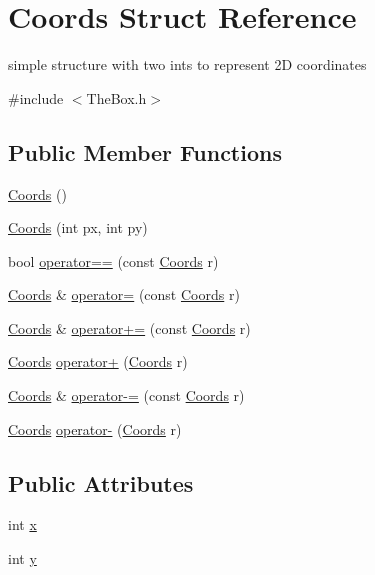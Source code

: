 \hypertarget{struct_coords}{\section{\-Coords \-Struct \-Reference}
\label{struct_coords}
}


simple structure with two ints to represent 2\-D coordinates  




{\ttfamily \#include $<$\-The\-Box.\-h$>$}

\subsection*{\-Public \-Member \-Functions}
\begin{DoxyCompactItemize}
\item 
\hyperlink{struct_coords_a5922d1783cefa759950faa50ac347191}{\-Coords} ()
\item 
\hyperlink{struct_coords_aa268e580151ea70eec212852dd4c5f94}{\-Coords} (int px, int py)
\item 
bool \hyperlink{struct_coords_a7507f92d1feefa3355ae8e9edae34e54}{operator==} (const \hyperlink{struct_coords}{\-Coords} r)
\item 
\hyperlink{struct_coords}{\-Coords} \& \hyperlink{struct_coords_a25bcb0e2d2f5677a10b7652e90a6f97b}{operator=} (const \hyperlink{struct_coords}{\-Coords} r)
\item 
\hyperlink{struct_coords}{\-Coords} \& \hyperlink{struct_coords_a2549173108b2479b62fd79b82ec54e01}{operator+=} (const \hyperlink{struct_coords}{\-Coords} r)
\item 
\hyperlink{struct_coords}{\-Coords} \hyperlink{struct_coords_a168a9ed9edbffaf04e67c5b39306ca99}{operator+} (\hyperlink{struct_coords}{\-Coords} r)
\item 
\hyperlink{struct_coords}{\-Coords} \& \hyperlink{struct_coords_a9f61875c64b3726afd0bb0d465889bad}{operator-\/=} (const \hyperlink{struct_coords}{\-Coords} r)
\item 
\hyperlink{struct_coords}{\-Coords} \hyperlink{struct_coords_a7cc7a225781b6bbad3e00a5e9572fee1}{operator-\/} (\hyperlink{struct_coords}{\-Coords} r)
\end{DoxyCompactItemize}
\subsection*{\-Public \-Attributes}
\begin{DoxyCompactItemize}
\item 
int \hyperlink{struct_coords_a59992d986e76375f31828d32c05cd15d}{x}
\item 
int \hyperlink{struct_coords_a7ed64d02fb7550f1506a93fcfab7f16f}{y}
\end{DoxyCompactItemize}


